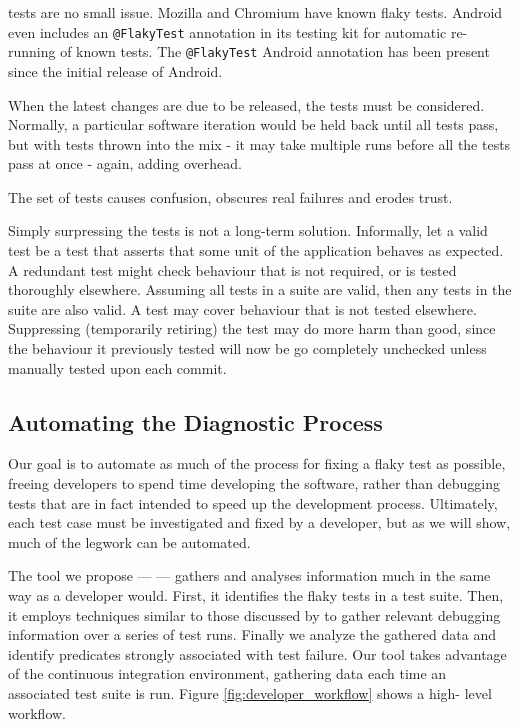 \Flaky tests are no small issue. Mozilla\cite{mozillaFlakyTestBug} and Chromium
have known flaky tests. Android even includes an {\tt @FlakyTest}
annotation\cite{androidFlakyInterface} in its testing kit for automatic re-
running of known \flaky tests. The {\tt @FlakyTest} Android annotation has been
present since the initial release of Android.

When the latest changes are due to be released, the \flaky tests must be
considered. Normally, a particular software iteration would be held back until
all tests pass, but with \flaky tests thrown into the mix - it may take multiple
runs before all the tests pass at once - again, adding overhead.

The set of \flaky tests causes confusion, obscures real failures and erodes
trust.

Simply surpressing the \flaky tests is not a long-term solution. Informally, let
a valid test be a test that asserts that some unit of the application behaves as
expected. A redundant test might check behaviour that is not required, or is
tested thoroughly elsewhere. Assuming all tests in a suite are valid, then any
\flaky tests in the suite are also valid. A \flaky test may cover behaviour that
is not tested elsewhere. Suppressing (temporarily retiring) the \flaky test may
do more harm than good, since the behaviour it previously tested will now be go
completely unchecked unless manually tested upon each commit.

\subsection{Automating the Diagnostic Process}

Our goal is to automate as much of the process for fixing a flaky test as
possible, freeing developers to spend time developing the software, rather than
debugging tests that are in fact intended to speed up the development process.
Ultimately, each test case must be investigated and fixed by a developer, but as
we will show, much of the legwork can be automated.

The tool we propose --- \textit{\venera} --- gathers and analyses information
much in the same way as a developer would. First, it identifies the flaky tests
in a test suite. Then, it employs techniques similar to those discussed by
\citet{ArumugaNainar:2010:ABI:1806799.1806839} to gather relevant debugging
information over a series of test runs. Finally we analyze the gathered data and
identify predicates strongly associated with test failure. Our tool takes
advantage of the continuous integration environment, gathering data each time an
associated test suite is run. Figure \ref{fig:developer_workflow} shows a high-
level \venera workflow.

